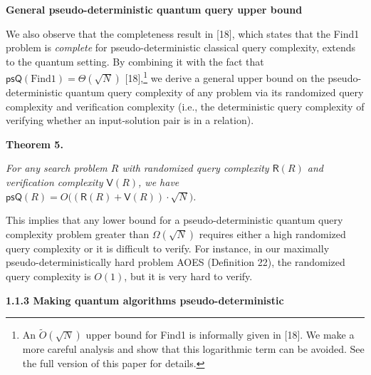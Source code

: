 \par\medskip\noindent\textbf{General pseudo-deterministic quantum query upper bound}\par




We also observe that the completeness result in [18], which states that the Find1 problem is \emph{complete} for pseudo-deterministic classical query complexity, extends to the quantum setting. By combining it with the fact that $\mathsf{psQ}({\text{Find1}})=\Theta(\sqrt{N})$ [18],\footnote{An $\tilde{O}(\sqrt{N})$ upper bound for Find1 is informally given in [18]. We make a more careful analysis and show that this logarithmic term can be avoided. See the full version of this paper for details.} we derive a general upper bound on the pseudo-deterministic quantum query complexity of any problem via its randomized query complexity and verification complexity (i.e., the deterministic query complexity of verifying whether an input-solution pair is in a relation).\par





\par\medskip\noindent\textbf{
\textbf{Theorem 5}\textbf{.}
}\par



\emph{For any search problem ${R}$ with randomized query complexity $\mathsf{R}(R)$ and verification complexity $\mathsf{V}(R)$, we have $\mathsf{psQ}(R)=O\big((\mathsf{R}(R)+\mathsf{V}(R))\cdot\sqrt{N}\big)$.}\par






This implies that any lower bound for a pseudo-deterministic quantum query complexity problem greater than $\Omega(\sqrt{N})$ requires either a high randomized query complexity or it is difficult to verify. For instance, in our maximally pseudo-deterministically hard problem AOES (Definition 22), the randomized query complexity is $O(1)$, but it is very hard to verify.\par






\par\medskip\noindent\textbf{
1.1.3 Making quantum algorithms pseudo-deterministic}\par




